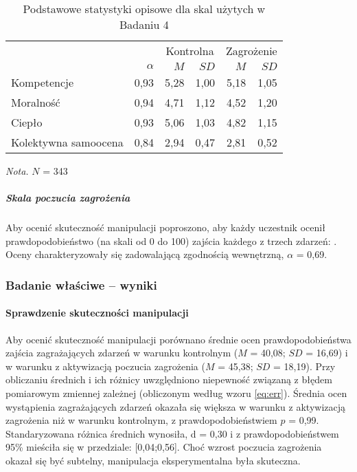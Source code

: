 \documentclass[man]{apa6}
\begin{document}
\begin{table*}[htbp]
\vspace*{2em}
\centering
\begin{threeparttable}
\caption{Podstawowe statystyki opisowe dla skal użytych w Badaniu 4}
\label{tab:5}

\begin{tabular}{lrrrrr}

\midrule
& & \multicolumn{2}{c}{Kontrolna} & \multicolumn{2}{c}{Zagrożenie}  \\
\cline{3-6}
& $\alpha$ & $M$ & $SD$ & $M$ & $SD$  \\
\midrule
Kompetencje            & 0,93 & 5,28 & 1,00 & 5,18 & 1,05  \\
Moralność              & 0,94 & 4,71 & 1,12 & 4,52 & 1,20  \\
Ciepło                 & 0,93 & 5,06 & 1,03 & 4,82 & 1,15  \\
Kolektywna samoocena   & 0,84 & 2,94 & 0,47 & 2,81 & 0,52  \\

\bottomrule

\end{tabular}

\begin{tablenotes}
{\small
\textit{Nota.} $N$ = 343
}
\end{tablenotes}
\end{threeparttable}
\end{table*}

\subparagraph{Skala poczucia zagrożenia} Aby ocenić skuteczność manipulacji poproszono, aby każdy uczestnik ocenił prawdopodobieństwo (na skali od 0 do 100) zajścia każdego z trzech zdarzeń: \emph{}. Oceny charakteryzowały się zadowalającą zgodnością wewnętrzną, $\alpha$ = 0,69.

\subsubsection{Badanie właściwe -- wyniki}
\paragraph{Sprawdzenie skuteczności manipulacji}
Aby ocenić skuteczność manipulacji porównano średnie ocen prawdopodobieństwa zajścia zagrażających zdarzeń w warunku kontrolnym ($M$ = 40,08; $SD$ = 16,69) i w warunku z aktywizacją poczucia zagrożenia ($M$ = 45,38; $SD$ = 18,19). Przy obliczaniu średnich i ich różnicy uwzględniono niepewność związaną z błędem pomiarowym zmiennej zależnej (obliczonym według wzoru \ref{eq:err}). Średnia ocen wystąpienia zagrażających zdarzeń okazała się większa w warunku z aktywizacją zagrożenia niż w warunku kontrolnym, z prawdopodobieństwiem $p$ = 0,99. Standaryzowana różnica średnich wynosiła, d = 0,30 i z prawdopodobieństwem 95\% mieściła się w przedziale: [0,04;0,56]. Choć wzrost poczucia zagrożenia okazał się być subtelny, manipulacja eksperymentalna była skuteczna.
\end{document}
